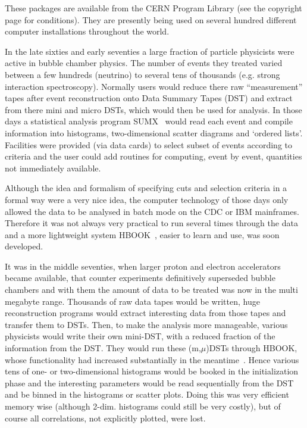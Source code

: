 These packages are available from the CERN Program Library 
(see the copyright page for conditions).
They are presently being used on several hundred different computer
installations throughout the world.

\label{HDATPROC}

In the late sixties and early seventies a large fraction of particle 
physicists were active in bubble chamber physics.
The number of events they treated varied between a few hundreds (neutrino) 
to several tens of thousands (e.g. strong interaction spectroscopy). 
Normally users would reduce there raw ``measurement'' tapes
after event reconstruction onto Data Summary Tapes (DST) and extract from
there mini and micro DSTs, which would then be used for analysis.
In those days a statistical analysis program SUMX~\cite{bib-SUMX}
would read each event and compile information into histograms,
two-dimensional scatter diagrams and `ordered lists'. Facilities were
provided (via data cards) to select subset of events according
to criteria and the user could add routines for computing, event by
event, quantities not immediately available.

Although the idea and formalism of specifying cuts and
selection criteria in a formal way were a very nice idea,
the computer technology of those days only allowed the data to be analysed
in batch mode on the CDC or IBM mainframes.
Therefore it was not always very practical to run several times
through the data and a more lightweight system 
HBOOK~,
easier to learn and use, was soon developed.

It was in the middle seventies, when larger proton and electron
accelerators became available, that counter experiments 
definitively superseded bubble chambers and with them the amount of data
to be treated was now in the multi megabyte range. Thousands of
raw data tapes would be written, huge reconstruction programs would
extract interesting data from those tapes and transfer them to 
DSTs. Then, to make the analysis more manageable, various physicists
would write their own mini-DST, with a reduced fraction of the
information from the DST. They would run these (m,$\mu$)DSTs through
HBOOK, whose functionality had increased substantially
in the meantime~.
Hence various tens of one- or two-dimensional histograms
would be booked in the initialization phase and the interesting
parameters would be read sequentially from the DST and
be binned in the histograms or scatter plots. 
Doing this was very efficient memory wise (although 2-dim.
histograms could still be very costly), but of course all correlations,
not explicitly plotted, were lost.

